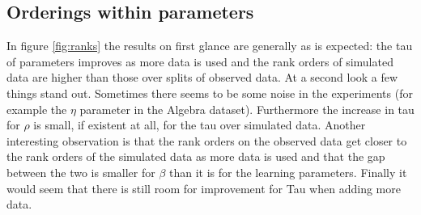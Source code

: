 \documentclass{scrartcl}
\begin{document}
\subsection{Orderings within parameters}
In figure \ref{fig:ranks} the results on first glance are generally as is expected: the tau of parameters improves as more data is used and the rank orders of simulated data are higher than those over splits of observed data. At a second look a few things stand out. Sometimes there seems to be some noise in the experiments (for example the $\eta$ parameter in the Algebra dataset). Furthermore the increase in tau for $\rho$ is small, if existent at all, for the tau over simulated data. Another interesting observation is that the rank orders on the observed data get closer to the rank orders of the simulated data as more data is used and that the gap between the two is smaller for $\beta$ than it is for the learning parameters. Finally it would seem that there is still room for improvement for Tau when adding more data.
\end{document}
